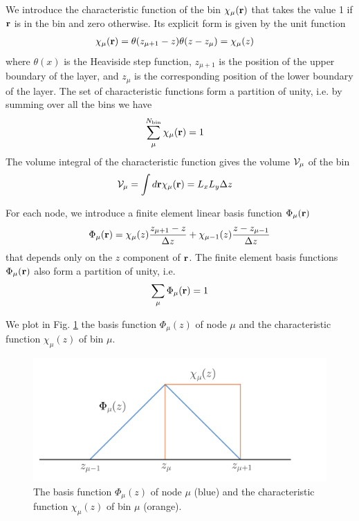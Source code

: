 \documentclass[b5paper,openright,11pt]{book}
\begin{document}
We  introduce the  characteristic function  of the  bin $\chi_\mu({\bf
  r})$ that  takes the value  1 if  ${\bf r}$ is  in the bin  and zero
otherwise.  Its explicit form is given by the unit function
\begin{align}
\chi_\mu({\bf r})&=\theta(z_{\mu+ 1}-z)\theta(z-z_\mu)=\chi_\mu(z)
\label{chi}
\end{align}
where $\theta(x)$ is  the Heaviside step function,  $z_{\mu+1}$ is the
position  of the  upper  boundary of  the layer,  and  $z_\mu$ is  the
corresponding  position  of  the  lower boundary  of  the  layer.   The set of characteristic
functions form  a partition of  unity, i.e.  by summing
over all the bins we have
\begin{align}
  \sum_{\mu}^{N_{\rm bin}}\chi_\mu({\bf r})&=1
\label{PartitionUnity}
\end{align}
The volume  integral of the  characteristic function gives  the volume
${\cal V}_\mu$ of the bin
\begin{align}
{\cal V}_\mu&=  \int d{\bf r}\chi_\mu({\bf r})= L_xL_y\Delta z
\end{align}

For each node, we  introduce  a finite element linear  basis  function
$\Phi_\mu({\bf r})$
\begin{align}
  \Phi_\mu({\bf r})=\chi_\mu(z)\frac{z_{\mu+1}-z}{\Delta z}+\chi_{\mu-1}(z)\frac{z-z_{\mu-1}}{\Delta z}
\end{align}
that depends only on the $z$ component of ${\bf r}$. 
The finite element basis functions $\Phi_\mu({\bf r})$ also form a partition of unity, i.e.
\begin{align}
  \sum_\mu\Phi_\mu({\bf r})=1
\label{partition}
\end{align}

We plot  in Fig.  \ref{psichi} the  basis function  $\Phi_\mu(z)$ of
node  $\mu$ and  the  characteristic function  $\chi_\mu(z)$ of  bin
$\mu$.
\begin{figure}[h]
  \centering
\includegraphics[scale=0.25]{psichi}
\caption{The basis function $\Phi_\mu(z)$ of node $\mu$ (blue) and the characteristic function $\chi_\mu(z)$ of bin $\mu$ (orange).}
\label{psichi}
\end{figure}
\end{document}
